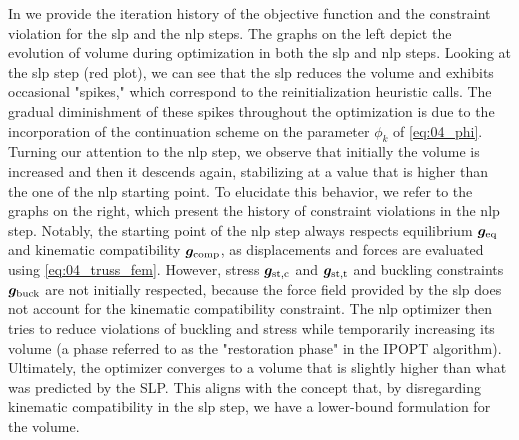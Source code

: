 In  we provide the iteration history of the objective function and the constraint violation for the \gls{slp} and the \gls{nlp} steps. The graphs on the left depict the evolution of volume during optimization in both the \gls{slp} and \gls{nlp} steps. Looking at the \gls{slp} step (red plot), we can see that the \gls{slp} reduces the volume and exhibits occasional "spikes," which correspond to the reinitialization heuristic calls. The gradual diminishment of these spikes throughout the optimization is due to the incorporation of the continuation scheme on the parameter $\phi_k$ of \eqref{eq:04_phi}. Turning our attention to the \gls{nlp} step, we observe that initially the volume is increased and then it descends again, stabilizing at a value that is higher than the one of the \gls{nlp} starting point. To elucidate this behavior, we refer to the graphs on the right, which present the history of constraint violations in the \gls{nlp} step. Notably, the starting point of the \gls{nlp} step always respects equilibrium $\bm{g}_\text{eq}$ and kinematic compatibility $\bm{g}_\text{comp}$, as displacements and forces are evaluated using \eqref{eq:04_truss_fem}. However, stress $\bm{g}_\text{st,c}$ and $\bm{g}_\text{st,t}$ and buckling constraints $\bm{g}_\text{buck}$ are not initially respected, because the force field provided by the \gls{slp} does not account for the kinematic compatibility constraint. The \gls{nlp} optimizer then tries to reduce violations of buckling and stress while temporarily increasing its volume (a phase referred to as the "restoration phase" in the IPOPT algorithm). Ultimately, the optimizer converges to a volume that is slightly higher than what was predicted by the SLP. This aligns with the concept that, by disregarding kinematic compatibility in the \gls{slp} step, we have a lower-bound formulation for the volume.

